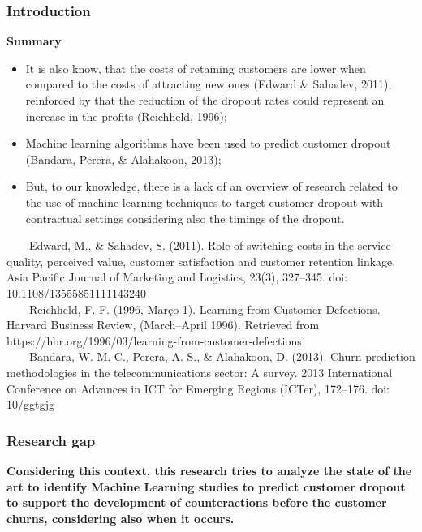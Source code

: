 \documentclass[10pt]{beamer}
\begin{document}
\begin{frame}
	\frametitle{Introduction}
	\Large
	\textbf{Summary}\\
		\begin{itemize} \normalsize

			\item It is also know, that the costs of retaining customers are lower when compared to the costs of attracting new ones \footnotesize(Edward \& Sahadev, 2011)\normalsize, reinforced by that the reduction of the dropout rates could represent an increase in the profits \footnotesize(Reichheld, 1996)\normalsize;
			\item Machine learning algorithms have been used to predict customer dropout \footnotesize(Bandara, Perera, \& Alahakoon, 2013)\normalsize;
			\item But, to our knowledge, there is a lack of an overview of research related to the use of machine learning techniques to target customer dropout with contractual settings considering also the timings of the dropout.
			
		\end{itemize}	
	\tiny
	~~~~Edward, M., \& Sahadev, S. (2011). Role of switching costs in the service quality, perceived value, customer satisfaction and customer retention linkage. Asia Pacific Journal of Marketing and Logistics, 23(3), 327–345. doi: 10.1108/13555851111143240 \\
	~~~~Reichheld, F. F. (1996, Março 1). Learning from Customer Defections. Harvard Business Review, (March–April 1996). Retrieved from https://hbr.org/1996/03/learning-from-customer-defections \\
	~~~~Bandara, W. M. C., Perera, A. S., \& Alahakoon, D. (2013). Churn prediction methodologies in the telecommunications sector: A survey. 2013 International Conference on Advances in ICT for Emerging Regions (ICTer), 172–176. doi: 10/ggtgjg\\
\end{frame}

\begin{frame}
	\frametitle{Research gap}
	\textbf{\large{Considering this context, this research tries to analyze the state of the art to identify Machine Learning studies to predict customer dropout to support the development of counteractions before the customer churns, considering also when it occurs.}}
\end{frame}
\end{document}
